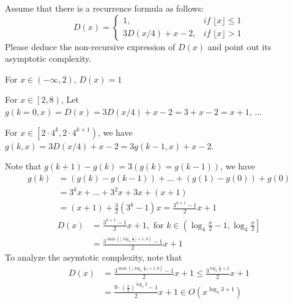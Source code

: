 \begin{exercise}[]{Assume that there is a recurrence formula as follows: 
  \begin{equation*}
    D(x) = \begin{cases}
    1, &if\;\lfloor x \rfloor \leq 1\\
    3D(x/4) + x - 2, &if\;\lfloor x \rfloor  > 1
    \end{cases}
  \end{equation*}
  Please deduce the non-recursive expression of $D(x)$ and point out its asymptotic complexity.    }
  \begin{solution}
  For $x\in \left(-\infty,2\right)$, $D(x)=1$

  For $x\in \left[2,8 \right)$, Let $g(k=0,x)=D(x)=3D(x/4) + x - 2 = 3 + x -2 = x + 1$, $\ldots$

  For $x\in \left[2\cdot 4^{k}, 2\cdot 4^{k+1}\right)$, we have $g(k,x) = 3D(x/4) + x - 2 = 3g(k-1,x) + x - 2$.

  Note that $g(k+1)-g(k)=3(g(k)=g(k-1))$, we have 
  \begin{equation}
    \begin{aligned}
      g(k) &= (g(k)-g(k-1)) + \ldots + (g(1)-g(0)) + g(0) \\
      &=  3^k x + \ldots + 3^2 x + 3x +(x+1) \\
      &= (x+1) + \frac{3}{2} (3^k-1) x = \frac{3^{k+1}-1}{2}x + 1
    \end{aligned}
  \end{equation}
  \begin{equation}
    \begin{aligned}
      D(x) &=  \frac{3^{k+1}-1}{2}x + 1, \text{ for } k \in \left( \log_4 \frac{x}{2}-1, \log_4 \frac{x}{2}\right] \\
      &= \frac{3^{ \max \left(\lfloor \log_4 {\frac{x}{2}}\rfloor+1, 0\right)}-1}{2}x + 1
    \end{aligned}
  \end{equation}
  To analyze the asymtotic complexity, note that
  \begin{equation}
    \begin{aligned}
      D(x) &=  \frac{3^{ \max \left(\lfloor \log_4 {\frac{x}{2}}\rfloor+1, 0\right)}-1}{2}x + 1 \le \frac{3^{  \log_4 {\frac{x}{2}}+2}}{2}x + 1 \\
      &= \frac{9\cdot\left(\frac{x}{2}\right)^{\log_{4} 3} - 1}{2} x + 1 \in O\left(x^{\log_{4} 3 + 1}\right)
    \end{aligned}
  \end{equation}
  \end{solution}
  \label{ex3}
\end{exercise}


